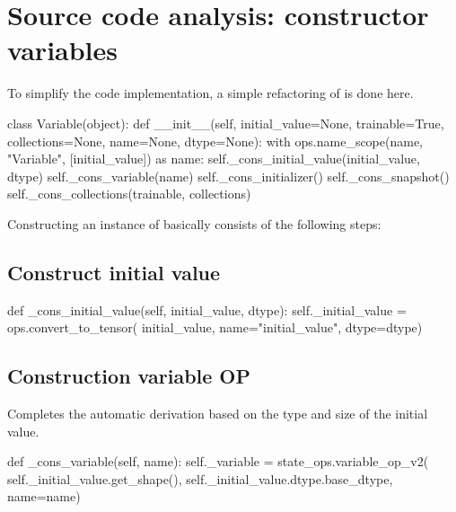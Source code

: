 \section{Source code analysis: constructor variables}
\begin{content}
To simplify the code implementation, a simple refactoring of  is done here.

\begin{leftbar}
\begin{python}
class Variable(object):
  def __init__(self, initial_value=None, trainable=True,
    collections=None, name=None, dtype=None):
    with ops.name_scope(name, "Variable", [initial_value]) as name:
      self._cons_initial_value(initial_value, dtype)
      self._cons_variable(name)
      self._cons_initializer()
      self._cons_snapshot()
    self._cons_collections(trainable, collections)
\end{python}
\end{leftbar}

Constructing an instance of  basically consists of the following steps:


\subsection{Construct initial value}

\begin{leftbar}
\begin{python}
  def _cons_initial_value(self, initial_value, dtype):
    self._initial_value = ops.convert_to_tensor(
        initial_value, name="initial_value", dtype=dtype)
\end{python}
\end{leftbar}


\subsection{Construction variable OP}
 Completes the automatic derivation based on the type and size of the initial value.

\begin{leftbar}
\begin{python}
  def _cons_variable(self, name):
    self._variable = state_ops.variable_op_v2(
      self._initial_value.get_shape(),
      self._initial_value.dtype.base_dtype,
      name=name)
\end{python}
\end{leftbar}



\end{content}
